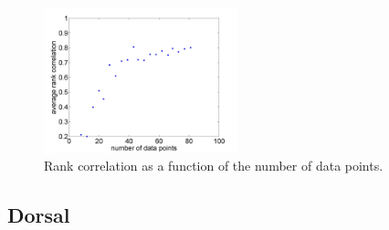 \documentclass[twocolumn, 11pt]{article}
\begin{document}
\begin{figure}[h]
\centering
\includegraphics[width=0.5\textwidth]{bootstrap_rank_corr}
\caption{Rank correlation as a function of the number of data points.}
\label{fig:bootstrap}
\end{figure}

\subsection{Dorsal}
\end{document}
